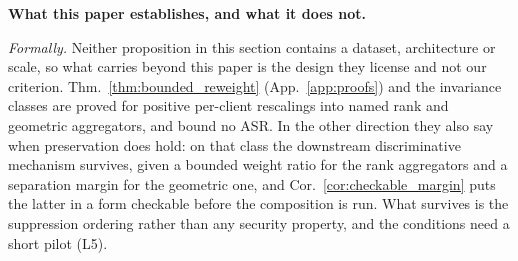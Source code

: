 \documentclass{article}
\begin{document}
\begin{framed}\small
{}\label{box:scope}
\textbf{What this paper establishes, and what it does not.}

\emph{Formally.} Neither proposition in this section contains a dataset, architecture or scale, so what carries
beyond this paper is the design they license and not our criterion. Thm.~\ref{thm:bounded_reweight}
(App.~\ref{app:proofs}) and the invariance classes are proved for positive per-client rescalings into
named rank and geometric aggregators, and bound no ASR. In the other direction they also say when
preservation does hold: on that class the downstream discriminative mechanism survives, given a bounded
weight ratio for the rank aggregators and a separation margin for the geometric one, and
Cor.~\ref{cor:checkable_margin} puts the latter in a form checkable before the composition is run. What
survives is the suppression ordering rather than any security property, and the conditions need a short
pilot (L5).


\end{framed}
\end{document}
